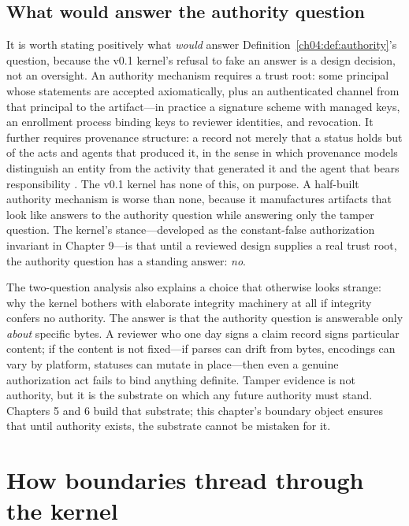 \subsection{What would answer the authority question}

It is worth stating positively what \emph{would} answer
Definition~\ref{ch04:def:authority}'s question, because the v0.1 kernel's
refusal to fake an answer is a design decision, not an oversight. An
authority mechanism requires a trust root: some principal whose statements
are accepted axiomatically, plus an authenticated channel from that principal
to the artifact---in practice a signature scheme with managed keys, an
enrollment process binding keys to reviewer identities, and revocation. It
further requires provenance structure: a record not merely that a status
holds but of the acts and agents that produced it, in the sense in which
provenance models distinguish an entity from the activity that generated it
and the agent that bears responsibility \cite{prov}. The v0.1 kernel has
none of this, on purpose. A half-built authority mechanism is worse than
none, because it manufactures artifacts that look like answers to the
authority question while answering only the tamper question. The kernel's
stance---developed as the constant-false authorization invariant in
Chapter 9---is that until a reviewed design supplies a real trust root,
the authority question has a standing answer: \emph{no}.

\begin{remark}
The two-question analysis also explains a choice that otherwise looks
strange: why the kernel bothers with elaborate integrity machinery at all if
integrity confers no authority. The answer is that the authority question is
answerable only \emph{about} specific bytes. A reviewer who one day signs a
claim record signs particular content; if the content is not fixed---if
parses can drift from bytes, encodings can vary by platform, statuses can
mutate in place---then even a genuine authorization act fails to bind
anything definite. Tamper evidence is not authority, but it is the substrate
on which any future authority must stand. Chapters 5 and 6 build that
substrate; this chapter's boundary object ensures that until authority
exists, the substrate cannot be mistaken for it.
\end{remark}

\section{How boundaries thread through the kernel}\label{ch04:threading}

